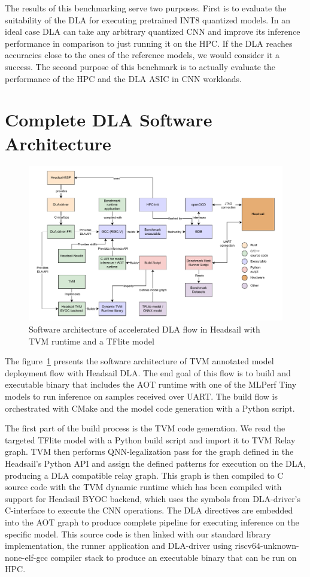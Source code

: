 \documentclass[12pt,a4paper,english
]{tunithesis}
\begin{document}
The results of this benchmarking serve two purposes. First is to evaluate the suitability of the DLA for executing pretrained INT8 quantized models. In an ideal case DLA can take any arbitrary quantized CNN and improve its inference performance in comparison to just running it on the HPC. If the DLA reaches accuracies close to the ones of the reference models, we would consider it a success.
The second purpose of this benchmark is to actually evaluate the performance of the HPC and the DLA ASIC in CNN workloads.

\section{Complete DLA Software Architecture}
\begin{figure}
\centering
\includegraphics[width=\linewidth]{img/dla-architecture-new.pdf}
\caption{Software architecture of accelerated DLA flow in Headsail with TVM runtime and a TFlite model}
\label{fig:architecture}
\end{figure}

The figure~\ref{fig:architecture} presents the software architecture of TVM annotated model deployment flow with Headsail DLA. The end goal of this flow is to build and executable binary that includes the AOT runtime with one of the MLPerf Tiny models to run inference on samples received over UART. The build flow is orchestrated with CMake and the model code generation with a Python script.

The first part of the build process is the TVM code generation. We read the targeted TFlite model with a Python build script and import it to TVM Relay graph.
TVM then performs QNN-legalization pass for the graph defined in the Headsail's Python API and assign the defined patterns for execution on the DLA, producing a DLA compatible relay graph.
This graph is then compiled to C source code with the TVM dynamic runtime which has been compiled with support for Headsail BYOC backend, which uses the symbols from DLA-driver's C-interface to execute the CNN operations. The DLA directives are embedded into the AOT graph to produce complete pipeline for executing inference on the specific model. This source code is then linked with our standard library implementation, the runner application and DLA-driver using riscv64-unknown-none-elf-gcc compiler stack to produce an executable binary that can be run on HPC.
\end{document}
